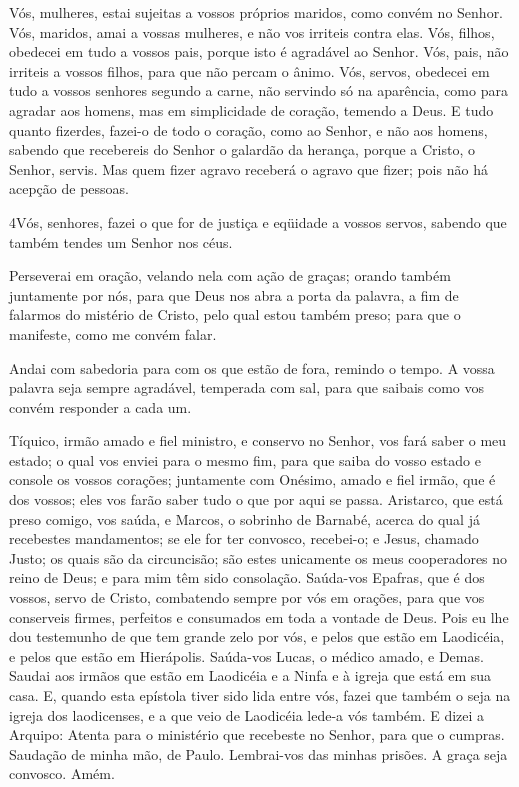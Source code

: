 Vós, mulheres, estai sujeitas a vossos próprios maridos, como
convém no Senhor. Vós, maridos, amai a vossas mulheres, e não
vos irriteis contra elas. Vós, filhos, obedecei em tudo a
vossos pais, porque isto é agradável ao Senhor. Vós, pais,
não irriteis a vossos filhos, para que não percam o ânimo.
Vós, servos, obedecei em tudo a vossos senhores segundo a
carne, não servindo só na aparência, como para agradar aos homens,
mas em simplicidade de coração, temendo a Deus. E tudo quanto
fizerdes, fazei-o de todo o coração, como ao Senhor, e não aos
homens, sabendo que recebereis do Senhor o galardão da
herança, porque a Cristo, o Senhor, servis. Mas quem fizer
agravo receberá o agravo que fizer; pois não há acepção de pessoas.

\medskip

\lettrine{4} Vós, senhores, fazei o que for de justiça e
eqüidade a vossos servos, sabendo que também tendes um Senhor nos
céus.

Perseverai em oração, velando nela com ação de graças; orando
também juntamente por nós, para que Deus nos abra a porta da
palavra, a fim de falarmos do mistério de Cristo, pelo qual estou
também preso; para que o manifeste, como me convém falar.

Andai com sabedoria para com os que estão de fora, remindo o
tempo. A vossa palavra seja sempre agradável, temperada com sal,
para que saibais como vos convém responder a cada um.

Tíquico, irmão amado e fiel ministro, e conservo no Senhor, vos
fará saber o meu estado; o qual vos enviei para o mesmo fim,
para que saiba do vosso estado e console os vossos corações;
juntamente com Onésimo, amado e fiel irmão, que é dos vossos;
eles vos farão saber tudo o que por aqui se passa. Aristarco,
que está preso comigo, vos saúda, e Marcos, o sobrinho de Barnabé,
acerca do qual já recebestes mandamentos; se ele for ter convosco,
recebei-o; e Jesus, chamado Justo; os quais são da
circuncisão; são estes unicamente os meus cooperadores no reino de
Deus; e para mim têm sido consolação. Saúda-vos Epafras, que
é dos vossos, servo de Cristo, combatendo sempre por vós em orações,
para que vos conserveis firmes, perfeitos e consumados em toda a
vontade de Deus. Pois eu lhe dou testemunho de que tem grande
zelo por vós, e pelos que estão em Laodicéia, e pelos que estão em
Hierápolis. Saúda-vos Lucas, o médico amado, e Demas.
Saudai aos irmãos que estão em Laodicéia e a Ninfa e à igreja
que está em sua casa. E, quando esta epístola tiver sido lida
entre vós, fazei que também o seja na igreja dos laodicenses, e a
que veio de Laodicéia lede-a vós também. E dizei a Arquipo:
Atenta para o ministério que recebeste no Senhor, para que o
cumpras. Saudação de minha mão, de Paulo. Lembrai-vos das
minhas prisões. A graça seja convosco. Amém.

